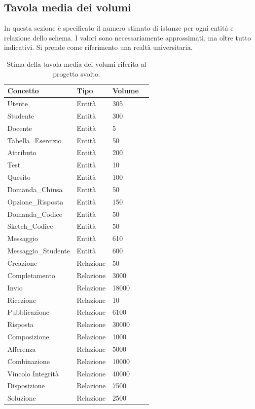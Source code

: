\documentclass{article}
\begin{document}
\newpage
\subsection{Tavola media dei volumi}
In questa sezione è specificato il numero stimato di istanze per ogni entità e relazione dello schema. I valori sono necessariamente approssimati, ma oltre tutto indicativi. Si prende come riferimento una realtà universitaria.
\begin{table}[h]
    \centering
    \begin{tabularx}{\textwidth}{|X|X|X|X|}
        \hline
        \bf Concetto & \bf Tipo & \bf Volume \\
        \hline
        Utente & Entità & 305 \\
        \hline
        Studente & Entità & 300 \\
        \hline
        Docente & Entità & 5 \\
        \hline
        Tabella\_Esercizio & Entità & 50 \\
        \hline
        Attributo & Entità & 200 \\
        \hline
        Test & Entità & 10 \\
        \hline
        Quesito & Entità & 100 \\
        \hline
        Domanda\_Chiusa & Entità & 50 \\
        \hline
        Opzione\_Risposta & Entità & 150 \\
        \hline
        Domanda\_Codice & Entità & 50 \\
        \hline
        Sketch\_Codice & Entità & 50 \\
        \hline
        Messaggio & Entità & 610 \\
        \hline
        Messaggio\_Studente & Entità & 600 \\
        \hline
        Creazione & Relazione & 50 \\
        \hline
        Completamento & Relazione & 3000 \\
        \hline
        Invio & Relazione & 18000 \\
        \hline
        Ricezione & Relazione & 10 \\
        \hline
        Pubblicazione & Relazione & 6100 \\
        \hline
        Risposta & Relazione & 30000 \\
        \hline
        Composizione & Relazione & 1000 \\
        \hline
        Afferenza & Relazione & 5000 \\
        \hline
        Combinazione & Relazione & 10000 \\
        \hline
        Vincolo Integrità & Relazione & 40000 \\
        \hline
        Disposizione & Relazione & 7500 \\
        \hline
        Soluzione & Relazione & 2500 \\
        \hline
    \end{tabularx}
    \caption{Stima della tavola media dei volumi riferita al progetto svolto.}
\end{table}
\end{document}
